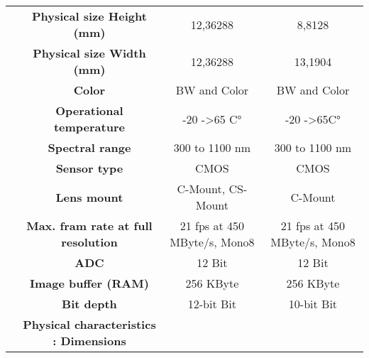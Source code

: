 \begin{table}[H]
{\begin{tabular}{ccc|cc|cc|}
\multicolumn{1}{|c|}{} &
  \multicolumn{2}{c|}{\cellcolor[HTML]{EFEFEF}\textbf{Physical size Height (mm)}} &
  \multicolumn{2}{c|}{\cellcolor[HTML]{EFEFEF}12,36288} &
  \multicolumn{2}{c|}{\cellcolor[HTML]{EFEFEF}8,8128} \\
\multicolumn{1}{|c|}{} &
  \multicolumn{2}{c|}{\textbf{Physical size Width  (mm)}} &
  \multicolumn{2}{c|}{12,36288} &
  \multicolumn{2}{c|}{13,1904} \\
\multicolumn{1}{|c|}{} &
  \multicolumn{2}{c|}{\cellcolor[HTML]{EFEFEF}\textbf{Color}} &
  \multicolumn{2}{c|}{\cellcolor[HTML]{EFEFEF}BW and Color} &
  \multicolumn{2}{c|}{\cellcolor[HTML]{EFEFEF}BW and Color} \\
\multicolumn{1}{|c|}{} &
  \multicolumn{2}{c|}{\textbf{Operational temperature}} &
  \multicolumn{2}{c|}{-20 -\textgreater 65 C°} &
  \multicolumn{2}{c|}{-20 -\textgreater 65C°} \\
\multicolumn{1}{|c|}{} &
  \multicolumn{2}{c|}{\cellcolor[HTML]{EFEFEF}\textbf{Spectral range}} &
  \multicolumn{2}{c|}{\cellcolor[HTML]{EFEFEF}300 to 1100 nm} &
  \multicolumn{2}{c|}{\cellcolor[HTML]{EFEFEF}300 to 1100 nm} \\
\multicolumn{1}{|c|}{} &
  \multicolumn{2}{c|}{\textbf{Sensor type}} &
  \multicolumn{2}{c|}{CMOS} &
  \multicolumn{2}{c|}{CMOS} \\
\multicolumn{1}{|c|}{} &
  \multicolumn{2}{c|}{\cellcolor[HTML]{EFEFEF}\textbf{Lens mount}} &
  \multicolumn{2}{c|}{\cellcolor[HTML]{EFEFEF}C-Mount, CS-Mount} &
  \multicolumn{2}{c|}{\cellcolor[HTML]{EFEFEF}C-Mount} \\
\multicolumn{1}{|c|}{} &
  \multicolumn{2}{c|}{\textbf{Max. fram rate at full resolution}} &
  \multicolumn{2}{c|}{21 fps at 450 MByte/s, Mono8} &
  \multicolumn{2}{c|}{21 fps at 450 MByte/s, Mono8} \\
\multicolumn{1}{|c|}{} &
  \multicolumn{2}{c|}{\cellcolor[HTML]{EFEFEF}\textbf{ADC}} &
  \multicolumn{2}{c|}{\cellcolor[HTML]{EFEFEF}12 Bit} &
  \multicolumn{2}{c|}{\cellcolor[HTML]{EFEFEF}12 Bit} \\
\multicolumn{1}{|c|}{} &
  \multicolumn{2}{c|}{\textbf{Image buffer (RAM)}} &
  \multicolumn{2}{c|}{256 KByte} &
  \multicolumn{2}{c|}{256 KByte} \\
\multicolumn{1}{|c|}{} &
  \multicolumn{2}{c|}{\cellcolor[HTML]{EFEFEF}\textbf{Bit depth}} &
  \multicolumn{2}{c|}{\cellcolor[HTML]{EFEFEF}12-bit Bit} &
  \multicolumn{2}{c|}{\cellcolor[HTML]{EFEFEF}10-bit Bit} \\
\multicolumn{1}{|c|}{} &
  \multicolumn{2}{c|}{\textbf{Physical characteristics : Dimensions}} &

\end{tabular}}
\end{table}
